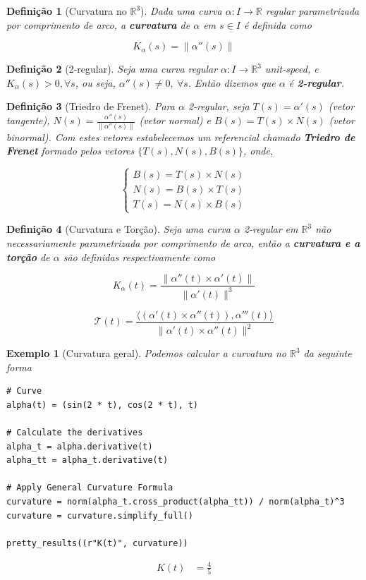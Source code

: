 \documentclass[12pt]{article}
\newtheorem{ex}{Exemplo}[section]
\newtheorem{definition}{Definição}
\begin{document}
\begin{definition}[Curvatura no $\mathbb{R}^3$]
Dada uma curva $\alpha: I \rightarrow \mathbb{R}$ regular parametrizada por comprimento de arco, a \textbf{curvatura} de $\alpha$ em $s \in I$ é definida como

$$K_\alpha(s) = \| \alpha''(s) \|$$
\end{definition}

\begin{definition}[2-regular]
Seja uma curva regular $\alpha: I \rightarrow \mathbb{R}^3$ \textit{unit-speed}, e $K_\alpha(s) > 0, \forall s$, ou seja, $\alpha''(s) \neq 0,\ \forall s$. Então dizemos que $\alpha$ é \textbf{2-regular}.
\end{definition}

\begin{definition}[Triedro de Frenet]
Para $\alpha$ 2-regular, seja $T(s) = \alpha'(s)$ (vetor tangente), $N(s) = \frac{\alpha''(s)}{\| \alpha''(s) \|}$ (vetor normal) e $B(s) = T(s) \times N(s)$ (vetor binormal). Com estes vetores estabelecemos um referencial chamado \textbf{Triedro de Frenet} formado pelos vetores $\{ T(s), N(s), B(s) \}$, onde,

$$ \left \{
\begin{array}{lll}
    B(s) = T(s) \times N(s) \\
    N(s) = B(s) \times T(s) \\
    T(s) = N(s) \times B(s)
\end{array} \right .
$$
\end{definition}

\begin{definition}[Curvatura e Torção]
Seja uma curva $\alpha$ 2-regular em $\mathbb{R}^3$ não necessariamente parametrizada por comprimento de arco, então a \textbf{curvatura e a torção} de $\alpha$ são definidas respectivamente como

$$K_\alpha(t) = \frac{\| \alpha''(t) \times \alpha'(t) \|}{\| \alpha'(t) \|^3}$$

$$\mathcal{T}(t) = \frac{\langle (\alpha'(t) \times \alpha''(t)), \alpha'''(t) \rangle}{\| \alpha'(t) \times \alpha''(t) \|^2}$$
\end{definition}

\begin{ex}[Curvatura geral] Podemos calcular a curvatura no $\mathbb{R}^3$ da seguinte forma

\begin{lstlisting}
# Curve
alpha(t) = (sin(2 * t), cos(2 * t), t)

# Calculate the derivatives
alpha_t = alpha.derivative(t)
alpha_tt = alpha_t.derivative(t)
    
# Apply General Curvature Formula
curvature = norm(alpha_t.cross_product(alpha_tt)) / norm(alpha_t)^3
curvature = curvature.simplify_full()

pretty_results((r"K(t)", curvature))
\end{lstlisting}

\newcommand{\Bold}[1]{\mathbf{#1}}\begin{align*} K(t) &= \frac{4}{5} \\ \end{align*}
\end{ex}
\end{document}
